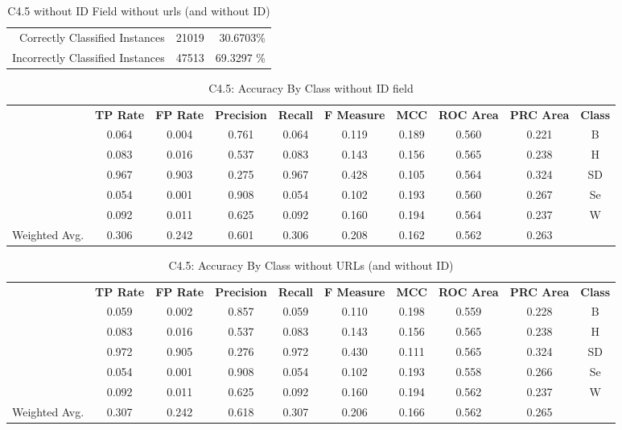 \documentclass[a4paper]{article}
\begin{document}
\begin{table}[H]
\centering
\caption{C4.5 without ID Field without urls (and without ID)}
\label{my-label}
  \begin{tabular}{rrr}
    Correctly Classified Instances & 21019 &30.6703\% \\
    Incorrectly Classified Instances & 47513 &69.3297 \% \\
  \end{tabular}
\end{table}

\begin{table}[H]
\centering
\caption{C4.5: Accuracy By Class without ID field}
\label{my-label}
  \begin{tabular}{cccccccccc}
&\textbf{TP Rate}&\textbf{FP Rate}&\textbf{Precision}&\textbf{Recall}&\textbf{F Measure}&\textbf{MCC}&\textbf{ROC Area}&\textbf{PRC Area}&\textbf{Class}\\
&0.064&0.004&0.761&0.064&0.119&0.189&0.560&0.221&B\\
&0.083&0.016&0.537&0.083&0.143&0.156&0.565&0.238&H\\
&0.967&0.903&0.275&0.967&0.428&0.105&0.564&0.324&SD\\
&0.054&0.001&0.908&0.054&0.102&0.193&0.560&0.267&Se\\
&0.092&0.011&0.625&0.092&0.160&0.194&0.564&0.237&W\\
Weighted Avg.&0.306&0.242&0.601&0.306&0.208&0.162&0.562&0.263\\
  \end{tabular}
\end{table}

\begin{table}[H]
\centering
\caption{C4.5: Accuracy By Class without URLs (and without ID)}
\label{my-label}
  \begin{tabular}{cccccccccc}
&\textbf{TP Rate}&\textbf{FP Rate}&\textbf{Precision}&\textbf{Recall}&\textbf{F Measure}&\textbf{MCC}&\textbf{ROC Area}&\textbf{PRC Area}&\textbf{Class}\\
&0.059&0.002&0.857&0.059&0.110&0.198&0.559&0.228&B\\
&0.083&0.016&0.537&0.083&0.143&0.156&0.565&0.238&H\\
&0.972&0.905&0.276&0.972&0.430&0.111&0.565&0.324&SD\\
&0.054&0.001&0.908&0.054&0.102&0.193&0.558&0.266&Se\\
&0.092&0.011&0.625&0.092&0.160&0.194&0.562&0.237&W\\
Weighted Avg.&0.307&0.242&0.618&0.307&0.206&0.166&0.562&0.265\\
  \end{tabular}
\end{table}
\end{document}

